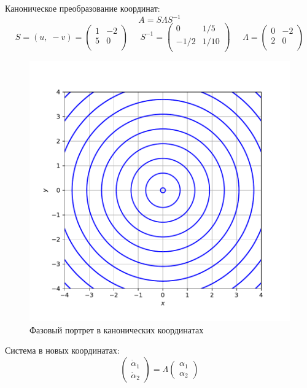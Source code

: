 \documentclass[a4paper, 12pt]{article}
\begin{document}
 Каноническое преобразование координат:
\[A = S\Lambda S^{-1}\]
\[
S = (u, \;-v) = \left(
\begin{array}{cc}
1 & -2\\
5 & 0\\
\end{array}
\right)\;\;\;\;\;
S^{-1} = \left(
\begin{array}{cc}
0 & 1/5\\
-1/2 & 1/10\\
\end{array}\right)\;\;\;\;\;
\Lambda = \left(
\begin{array}{cc}
0 & -2\\
2 & 0\\
\end{array}\right)
\]
\begin{figure}[H]
	\centering
	\includegraphics[scale=0.7]{3a1_0}
	\caption{Фазовый портрет в канонических координатах}
	\label{im:1a1_0}
\end{figure}
Система в новых координатах:
\[\left(
\begin{array}{c}
\dot{\alpha}_1\\
\dot{\alpha}_2
\end{array}
\right)=\Lambda\left(
\begin{array}{c}
{\alpha}_1 \\
{\alpha}_2
\end{array}
\right)\]
\end{document}
